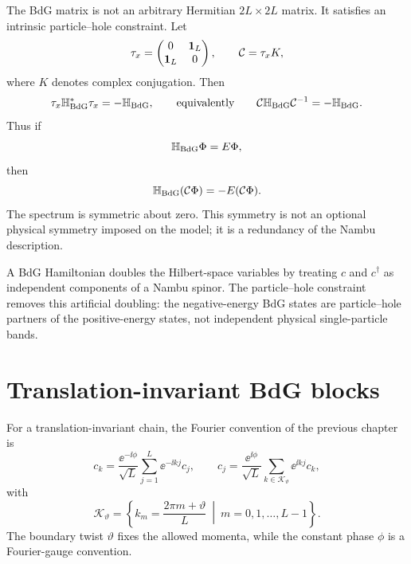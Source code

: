 The BdG matrix is not an arbitrary Hermitian $2L\times 2L$ matrix.  It satisfies
an intrinsic particle--hole constraint.  Let
\begin{equation}
    \tau_x=
    \begin{pmatrix}
        0&\mathbf{1}_L\\
        \mathbf{1}_L&0
    \end{pmatrix},
    \qquad
    \mathcal{C}=\tau_x K,
\end{equation}
where $K$ denotes complex conjugation.  Then
\begin{equation}
\label{eq:bdg-real-space-phs}
    \tau_x\mathbb{H}_{\rm BdG}^*\tau_x
    =
    -\mathbb{H}_{\rm BdG},
    \qquad
    \text{equivalently}\qquad
    \mathcal{C}\mathbb{H}_{\rm BdG}\mathcal{C}^{-1}
    =
    -\mathbb{H}_{\rm BdG}.
\end{equation}
Thus if
\begin{equation}
    \mathbb{H}_{\rm BdG}\Phi=E\Phi,
\end{equation}
then
\begin{equation}
    \mathbb{H}_{\rm BdG}(\mathcal{C}\Phi)=-E(\mathcal{C}\Phi).
\end{equation}
The spectrum is symmetric about zero.  This symmetry is not an optional physical
symmetry imposed on the model; it is a redundancy of the Nambu description.

\begin{principle}
A BdG Hamiltonian doubles the Hilbert-space variables by treating $c$ and
$c^\dagger$ as independent components of a Nambu spinor.  The particle--hole
constraint removes this artificial doubling: the negative-energy BdG states are
particle--hole partners of the positive-energy states, not independent physical
single-particle bands.
\end{principle}

\section{Translation-invariant BdG blocks}

For a translation-invariant chain, the Fourier convention of the previous
chapter is
\begin{equation}
\label{eq:bdg-chapter-fourier-convention}
    c_k
    =
    \frac{\ee^{-\ii\phi}}{\sqrt{L}}
    \sum_{j=1}^{L}\ee^{-\ii kj}c_j,
    \qquad
    c_j
    =
    \frac{\ee^{\ii\phi}}{\sqrt{L}}
    \sum_{k\in\mathcal{K}_\vartheta}\ee^{\ii kj}c_k,
\end{equation}
with
\begin{equation}
    \mathcal{K}_\vartheta
    =
    \left\{
        k_m=\frac{2\pi m+\vartheta}{L}
        \ \middle|\
        m=0,1,\ldots,L-1
    \right\}.
\end{equation}
The boundary twist $\vartheta$ fixes the allowed momenta, while the constant
phase $\phi$ is a Fourier-gauge convention.

